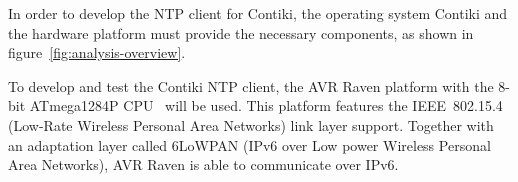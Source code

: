 In order to develop the NTP client for Contiki,
the operating system Contiki and the hardware platform must provide the necessary
components, as shown in figure~\ref{fig:analysis-overview}.

To develop and test the Contiki NTP client,
the AVR Raven platform with the 8-bit ATmega1284P CPU~\cite{avr-datasheet} will be used.
This platform features the IEEE~802.15.4 (Low-Rate Wireless Personal Area Networks) link layer support.
Together with an adaptation layer called 6LoWPAN (IPv6 over Low power Wireless Personal Area Networks),
AVR Raven is able to communicate over IPv6.








